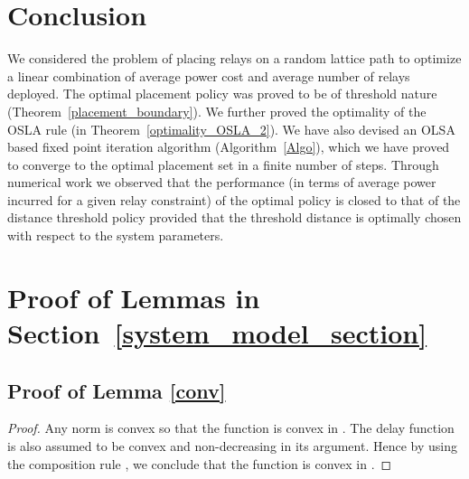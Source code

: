 \documentclass[conference]{IEEEtran}
\begin{document}
\section{Conclusion}
We considered the problem of placing relays on a random lattice path
to optimize a linear combination of average power cost and average
number of relays deployed. The optimal placement policy was proved to
be of threshold nature (Theorem~\ref{placement_boundary}).  We further
proved the optimality of the OSLA rule (in
Theorem~\ref{optimality_OSLA_2}).  We have also devised an OLSA based
fixed point iteration algorithm (Algorithm~\ref{Algo}), which we have
proved to converge to the optimal placement set in a finite number of
steps.  Through numerical work we observed that the performance (in
terms of average power incurred for a given relay constraint) of the
optimal policy is closed to that of the distance threshold policy
provided that the threshold distance is optimally chosen with respect
to the system parameters.




\clearpage
\appendices

\section{Proof of Lemmas in Section~\ref{system_model_section}}
\subsection{Proof of Lemma \ref{conv}}
\label{conv_appendix}
\begin{proof}
Any norm is convex so that the function  is convex 
in . The delay function  is also assumed to be convex and non-decreasing in its argument. Hence by using the composition rule 
\cite[Section~3.2.4]{Boyd}, we conclude that the function  is convex in . 
\end{proof}
\end{document}
